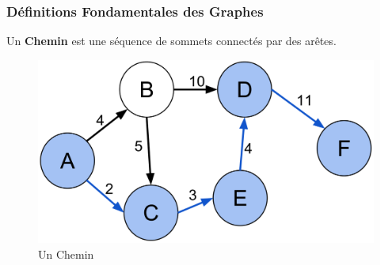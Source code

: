 \begin{frame}
\frametitle{Définitions Fondamentales des Graphes}

\begin{tcolorbox}[colback=orange!10,colframe=orange!100!black,
    title=Un Chemin]
    Un \textbf{Chemin} est une séquence de sommets connectés par des arêtes.
\end{tcolorbox}

\begin{figure}[H]
    \centering
    \includegraphics[width=0.5 \textwidth]{Figures/chemin.png}
    \caption{Un Chemin}
    \label{fig:Un Chemin}
\end{figure}

\end{frame}
